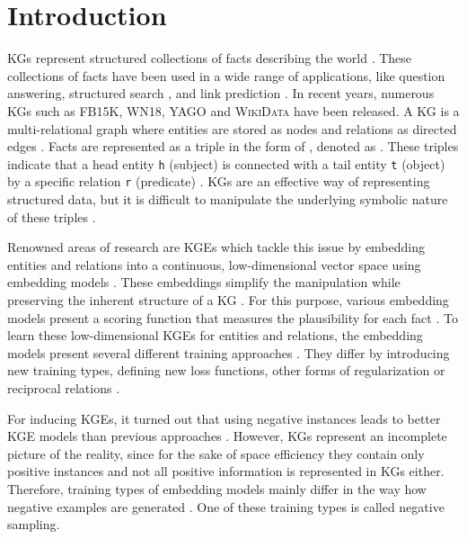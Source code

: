 \chapter{Introduction}
\label{ch:introduction}

\acp{KG} represent structured collections of facts describing the world  \cite{hogan2020knowledge}.
These collections of facts have been used in a wide range of applications, like question answering, structured search \cite{zhang2019nscaching}, and link prediction \cite{cai2017kbgan, Alam2020AffinityDN}.
In recent years, numerous \acp{KG} such as \textsc{FB15K}, \textsc{WN18}, \textsc{YAGO} \cite{ConEx} and \textsc{WikiData} \cite{arnaoutwikinegata} have been released.
A \ac{KG} is a multi-relational graph where entities are stored as nodes and relations as directed edges \cite{zhang2019nscaching}.
Facts are represented as a triple in the form of , denoted as .
These triples indicate that a head entity \texttt{h} (subject) is connected with a tail entity \texttt{t} (object) by a specific relation \texttt{r} (predicate) \cite{zhang2019nscaching, Alam2020AffinityDN}.
\acp{KG} are an effective way of representing structured data, but it is difficult to manipulate the underlying symbolic nature of these triples \cite{8047276}.

Renowned areas of research are \acp{KGE} which tackle this issue by embedding entities and relations into a continuous, low-dimensional vector space using embedding models \cite{Alam2020AffinityDN}.
These embeddings simplify the manipulation while preserving the inherent structure of a \ac{KG} \cite{8047276}. 
For this purpose, various embedding models present a scoring function that measures the plausibility for each fact \cite{8047276, ConvE, qiannegative}.
To learn these low-dimensional \acp{KGE} for entities and relations, the embedding models present several different training approaches \cite{Ruffinelli2020You}.
They differ by introducing new training types, defining new loss functions, other forms of regularization or reciprocal relations \cite{Ruffinelli2020You}.

For inducing \acp{KGE}, it turned out that using negative instances leads to better \ac{KGE} models than previous approaches \cite{kotnis2017analysis}.
However, \acp{KG} represent an incomplete picture of the reality, since for the sake of space efficiency they contain only positive instances \cite{qiannegative} and not all positive information is represented in \acp{KG} either.
Therefore, training types of embedding models mainly differ in the way how negative examples are generated \cite{Ruffinelli2020You}. 
One of these training types is called negative sampling.
\clearpage

%

%

%

%
